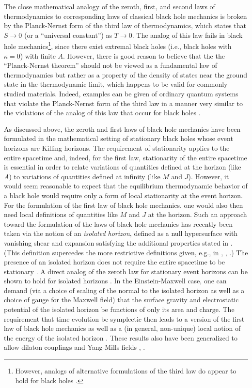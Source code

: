 \documentclass[12pt]{article}
\begin{document}
The close mathematical analogy of the zeroth, first, and second laws
of thermodynamics to corresponding laws of classical black hole
mechanics is broken by the Planck-Nernst form of the third law of
thermodynamics, which states that $S \rightarrow 0$ (or a ``universal
constant'') as $T \rightarrow 0$. The analog of this law fails in
black hole mechanics\footnote{However, analogs of alternative
formulations of the third law do appear to hold for black holes
\cite{i1}.}, since there exist extremal black holes (i.e., black holes
with $\kappa = 0$) with finite $A$. However, there is good reason to
believe that the the ``Planck-Nernst theorem'' should not be viewed as
a fundamental law of thermodynamics \cite{al} but rather as a property
of the density of states near the ground state in the thermodynamic
limit, which happens to be valid for commonly studied
materials. Indeed, examples can be given of ordinary quantum systems
that violate the Planck-Nernst form of the third law in a manner very
similar to the violations of the analog of this law that occur for
black holes \cite{w5}.

As discussed above, the zeroth and first laws of black hole mechanics
have been formulated in the mathematical setting of stationary black
holes whose event horizons are Killing horizons. The requirement of
stationarity applies to the entire spacetime and, indeed, for the
first law, stationarity of the entire spacetime is essential in order
to relate variations of quantities defined at the horizon (like $A$)
to variations of quantities defined at infinity (like $M$ and
$J$). However, it would seem reasonable to expect that the equilibrium
thermodynamic behavior of a black hole would require only a form of
local stationarity at the event horizon. For the formulation of the
first law of black hole mechanics, one would also then need local
definitions of quantities like $M$ and $J$ at the horizon. Such an
approach toward the formulation of the laws of black hole mechanics
has recently been taken via the notion of an {\it isolated horizon},
defined as a null hypersurface with vanishing shear and expansion
satisfying the additional properties stated in \cite{abdf}. (This
definition supercedes the more restrictive definitions given, e.g., in
\cite{abf1}, \cite{abf}, \cite{ac}.) The presence of an isolated
horizon does not require the entire spacetime to be stationary
\cite{lewa}.  A direct analog of the zeroth law for stationary event
horizons can be shown to hold for isolated horizons \cite{afk}. In the
Einstein-Maxwell case, one can demand (via a choice of scaling of the
normal to the isolated horizon as well as a choice of gauge for the
Maxwell field) that the surface gravity and electrostatic potential of
the isolated horizon be functions of only its area and charge. The
requirement that time evolution be symplectic then leads to a version
of the first law of black hole mechanics as well as a (in general,
non-unique) local notion of the energy of the isolated horizon
\cite{afk}.  These results also have been generalized to allow dilaton
couplings \cite{ac} and Yang-Mills fields \cite{cns}, \cite{afk}.
\end{document}
